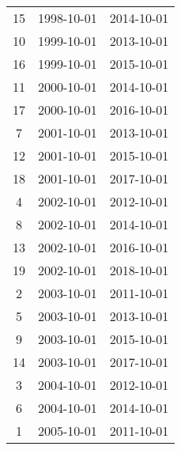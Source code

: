 % 
\begin{tabular}{ccc}
  \hline
  \hline
15 & 1998-10-01 & 2014-10-01 \\ 
  10 & 1999-10-01 & 2013-10-01 \\ 
  16 & 1999-10-01 & 2015-10-01 \\ 
  11 & 2000-10-01 & 2014-10-01 \\ 
  17 & 2000-10-01 & 2016-10-01 \\ 
  7 & 2001-10-01 & 2013-10-01 \\ 
  12 & 2001-10-01 & 2015-10-01 \\ 
  18 & 2001-10-01 & 2017-10-01 \\ 
  4 & 2002-10-01 & 2012-10-01 \\ 
  8 & 2002-10-01 & 2014-10-01 \\ 
  13 & 2002-10-01 & 2016-10-01 \\ 
  19 & 2002-10-01 & 2018-10-01 \\ 
  2 & 2003-10-01 & 2011-10-01 \\ 
  5 & 2003-10-01 & 2013-10-01 \\ 
  9 & 2003-10-01 & 2015-10-01 \\ 
  14 & 2003-10-01 & 2017-10-01 \\ 
  3 & 2004-10-01 & 2012-10-01 \\ 
  6 & 2004-10-01 & 2014-10-01 \\ 
  1 & 2005-10-01 & 2011-10-01 \\ 
   \hline
\end{tabular}
